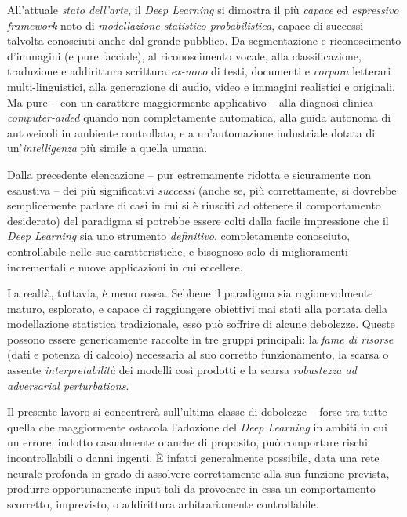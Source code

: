 \documentclass[a4paper, twoside]{article}
\begin{document}
All'attuale \textit{stato dell'arte}, il \textit{Deep Learning} si dimostra il più \textit{capace} ed \textit{espressivo} \textit{framework} noto di \textit{modellazione statistico-probabilistica}, capace di successi talvolta conosciuti anche dal grande pubblico. Da segmentazione e riconoscimento d'immagini (e pure facciale), al riconoscimento vocale, alla classificazione, traduzione e addirittura scrittura \textit{ex-novo} di testi, documenti e \textit{corpora} letterari multi-linguistici, alla generazione di audio, video e immagini realistici e originali. Ma pure -- con un carattere maggiormente applicativo -- alla diagnosi clinica \textit{computer-aided} quando non completamente automatica, alla guida autonoma di autoveicoli in ambiente controllato, e a un'automazione industriale dotata di un'\textit{intelligenza} più simile a quella umana.

Dalla precedente elencazione -- pur estremamente ridotta e sicuramente non esaustiva -- dei più significativi \textit{successi} (anche se, più correttamente, si dovrebbe semplicemente parlare di casi in cui si è riusciti ad ottenere il comportamento desiderato) del paradigma si potrebbe essere colti dalla facile impressione che il \textit{Deep Learning} sia uno strumento \textit{definitivo}, completamente conosciuto, controllabile nelle sue caratteristiche, e bisognoso solo di miglioramenti incrementali e nuove applicazioni in cui eccellere.

La realtà, tuttavia, è meno rosea. Sebbene il paradigma sia ragionevolmente maturo, esplorato, e capace di raggiungere obiettivi mai stati alla portata della modellazione statistica tradizionale, esso può soffrire di alcune debolezze. Queste possono essere genericamente raccolte in tre gruppi principali: la \textit{fame di risorse} (dati e potenza di calcolo) necessaria al suo corretto funzionamento, la scarsa o assente \textit{interpretabilità} dei modelli così prodotti e la scarsa \textit{robustezza ad adversarial perturbations}.

Il presente lavoro si concentrerà sull'ultima classe di debolezze -- forse tra tutte quella che maggiormente ostacola l'adozione del \textit{Deep Learning} in ambiti in cui un errore, indotto casualmente o anche di proposito, può comportare rischi incontrollabili o danni ingenti. È infatti generalmente possibile, data una rete neurale profonda in grado di assolvere correttamente alla sua funzione prevista, produrre opportunamente input tali da provocare in essa un comportamento scorretto, imprevisto, o addirittura arbitrariamente controllabile.
\end{document}

